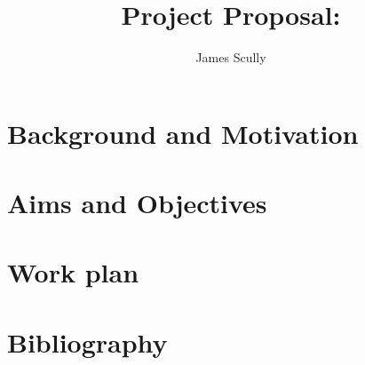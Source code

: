 \documentclass[11pt]{article}
\title{Project Proposal: \projectTitle}
\author{James Scully}
\begin{document}
\maketitle

\section{Background and Motivation}




\newpage
\section{Aims and Objectives}


\newpage
\section{Work plan}



\newpage
\section{Bibliography}
\end{document}
